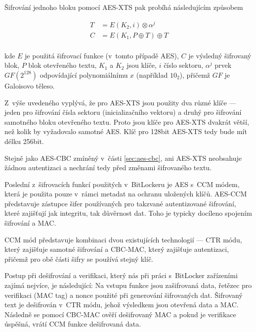 
Šifrování jednoho bloku pomocí AES-XTS pak probíhá následujícím způsobem

\begin{align}
T &= E (K_2 , i) \otimes \alpha^j \\
C &= E (K_1 , P \oplus T) \oplus T \\ \nonumber
\end{align}

kde $E$ je použitá šifrovací funkce (v~tomto případě AES), $C$ je výsledný šifrovaný blok, $P$ blok otevřeného textu, $K_1$ a $K_2$ jsou klíče, $i$ číslo sektoru, $\alpha^j$ prvek $GF(2^{128})$ odpovídající polynomiálnímu $x$ (například $10_2$), přičemž $GF$ je Galoisovo těleso.\cite{IEEE2008}

Z~výše uvedeného vyplývá, že pro AES-XTS jsou použity dva různé klíče --- jeden pro šifrování čísla sektoru (inicializačního vektoru) a druhý pro šifrování samotného bloku otevřeného textu. Proto jsou klíče pro AES-XTS dvakrát větší, než kolik by vyžadovalo samotné AES. Klíč pro 128bit AES-XTS tedy bude mít délku 256bit.

Stejně jako AES-CBC zmíněný v~části \ref{sec:aes-cbc}, ani AES-XTS neobsahuje žádnou autentizaci a nechrání tedy před změnami šifrovaného textu.


Poslední z~šifrovacích funkcí použitých v~BitLockeru je AES s~CCM módem, která je použita pouze v~rámci metadat na ochranu uložených klíčů. AES-CCM představuje zástupce šifer používaných pro takzvané autentizované šifrování, které zajišťují jak integritu, tak důvěrnost dat. Toho je typicky docíleno spojením šifrování a MAC.\cite{ISO2009}

CCM mód představuje kombinaci dvou existujících technologií --- CTR módu, který zajišťuje samotné šifrování a CBC-MAC, který zajišťuje autentizaci, přičemž pro obě části šifry se používá stejný klíč.

Postup při dešifrování a verifikaci, který nás při práci s~BitLocker zařízeními zajímá nejvíce, je následující: Na vstupu funkce jsou zašifrovaná data, řetězec pro ve\-ri\-fi\-ka\-ci (MAC tag) a nonce použité při generování šifrovaných dat. Šifrovaný text je dešifrován v~CTR módu, jehož výsledkem jsou otevřená data a MAC. Následně se pomocí CBC-MAC ověří dešifrovaný MAC a pokud je verifikace úspěšná, vrátí CCM funkce dešifrovaná data.\cite{Dworkin2004}

